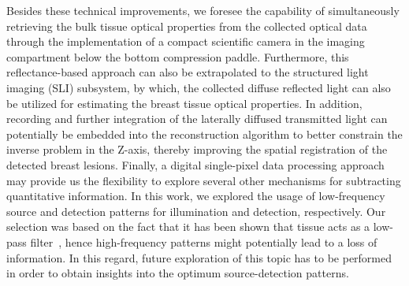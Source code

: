 Besides these technical improvements, we foresee the capability of simultaneously retrieving the bulk tissue optical properties from the collected optical data through the implementation of a compact scientific camera in the imaging compartment below the bottom compression paddle. Furthermore, this reflectance-based approach can also be extrapolated to the structured light imaging (SLI) subsystem, by which, the collected diffuse reflected light can also be utilized for estimating the breast tissue optical properties. In addition, recording and further integration of the laterally diffused transmitted light can potentially be embedded into the reconstruction algorithm to better constrain the inverse problem in the Z-axis, thereby improving the spatial registration of the detected breast lesions. Finally, a digital single-pixel data processing approach~\cite{Belanger2010,Pian2015} may provide us the flexibility to explore several other mechanisms for subtracting quantitative information. In this work, we explored the usage of low-frequency source and detection patterns for illumination and detection, respectively. Our selection was based on the fact that it has been shown that tissue acts as a low-pass filter~\cite{OSullivan2012}, hence high-frequency patterns might potentially lead to a loss of information. In this regard, future exploration of this topic has to be performed in order to obtain insights into the optimum source-detection patterns.



